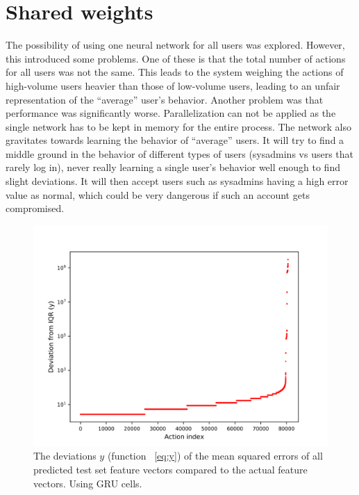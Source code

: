 \section{Shared weights}
The possibility of using one neural network for all users was explored. However, this introduced some problems. One of these is that the total number of actions for all users was not the same. This leads to the system weighing the actions of high-volume users heavier than those of low-volume users, leading to an unfair representation of the \enquote{average} user's behavior. Another problem was that performance was significantly worse. Parallelization can not be applied as the single network has to be kept in memory for the entire process. The network also gravitates towards learning the behavior of \enquote{average} users. It will try to find a middle ground in the behavior of different types of users (sysadmins vs users that rarely log in), never really learning a single user's behavior well enough to find slight deviations. It will then accept users such as sysadmins having a high error value as normal, which could be very dangerous if such an account gets compromised.

\begin{figure}
	\begin{center}
		\includegraphics[scale=6.0]{experiments/cell/deviations/gru}
	\end{center}
	\caption{The deviations \(y\) (function ~\ref{eq:y}) of the mean squared errors of all predicted test set feature vectors compared to the actual feature vectors. Using GRU cells.~\label{fig:gru_deviations}}
\end{figure}

